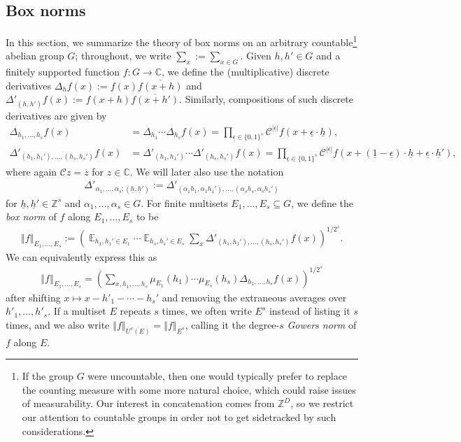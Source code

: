 \documentclass[11pt]{amsart}
\theoremstyle{definition}
\DeclareMathOperator*{\E}{\mathbb{E}}
\newcommand{\C}{{\mathbb C}}
\newcommand{\Z}{{\mathbb Z}}
\newcommand{\CC}{{\mathcal C}}
\newcommand{\uh}{{\underline{h}}}
\newcommand{\ueps}{{\underline{\epsilon}}}
\newcommand{\norm}[1]{\left\Vert #1\right\Vert}
\newcommand{\brac}[1]{\mathopen{}\left( #1 \mathclose{}\right)}
\begin{document}
\subsection{Box norms}
In this section, we summarize
the theory of box norms on an arbitrary countable\footnote{{If the group $G$ were uncountable, then one would typically prefer to replace the counting measure with some more natural choice, which could raise issues of measurability. Our interest in concatenation comes from $\Z^D$, so we restrict our attention to countable groups in order not to get sidetracked by such considerations.}} abelian group $G$; throughout, we write $\sum_x:=\sum_{x\in G}$. Given $h, h'\in G$ and a finitely supported function $f: G\to\C$, we define
the (multiplicative) discrete derivatives
$\Delta_h f(x) := f(x)\overline{f(x+h)}$ and $\Delta'_{(h,h')} f(x) := f(x+h)\overline{f(x+h')}$.  Similarly, compositions of such discrete derivatives are given by
\begin{align}
    \label{E: asymmetric derivative} \Delta_{h_1, \ldots, h_s}f(x) &= \Delta_{h_1}\cdots \Delta_{h_s}f(x) = \prod_{\ueps\in\{0,1\}^s}\CC^{|\ueps|}f(x+\ueps\cdot \uh),\\
    \label{E: symmetric derivative}\Delta'_{(h_1, h_1'), \ldots, (h_s,h_s')}f(x) &= \Delta'_{(h_1, h_1')}\cdots\Delta'_{(h_s, h_s')}f(x) = \prod_{\ueps\in\{0,1\}^s}\CC^{|\ueps|}f(x+(\underline{1}-\ueps)\cdot\uh + \ueps\cdot\uh'),
\end{align}
where again $\CC z = \overline{z}$ for $z\in\C$.
We will later also use the notation
\begin{align*}
    \Delta'_{\alpha_1,\ldots, \alpha_s; (\uh, \uh')} := \Delta'_{(\alpha_1 h_1, \alpha_1 h_1'), \ldots, (\alpha_s h_s, \alpha_s h_s')}
\end{align*}
{for $\uh, \uh' \in \Z^s$ and $\alpha_1, \ldots, \alpha_s\in G$.}
For finite multisets $E_1, \ldots, E_s\subseteq G$, we define the \textit{box norm} of $f$ {along}  $E_1, \ldots, E_s$ to be
\begin{align}\label{E: box norm}
    \norm{f}_{E_1, \ldots, E_s}:=\brac{\E_{h_1, h_1'\in E_1}\cdots\E_{h_s, h_s'\in E_s}\sum_x \Delta'_{(h_1, h_1'), \ldots, (h_s,h_s')}f(x)}^{1/2^s}.
\end{align}
We can equivalently express this as
\begin{align}\label{E: box norms with Fejer kernels}
    \norm{f}_{E_1, \ldots, E_s} = \brac{\sum_{x, h_1, \ldots, h_s} \mu_{E_1}(h_1)\cdots \mu_{E_s}(h_s) \Delta_{h_1, \ldots, h_s}f(x)}^{1/2^s}
\end{align}
after shifting $x\mapsto x-h'_1-\cdots - h_s'$ and removing the extraneous averages over $h'_1, \ldots, h'_s$. If a multiset $E$ repeats $s$ times, we often write $E^s$ instead of listing it $s$ times, and we also write $\norm{f}_{U^s(E)} = \norm{f}_{E^s}$, calling it the degree-$s$ \textit{Gowers norm} of $f$ along $E$.
\end{document}
